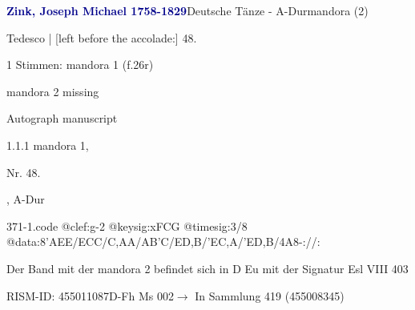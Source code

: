 \documentclass[twocolumn]{book}
\begin{document}
\par \vspace{7pt} \textcolor{darkblue}{\textbf{Zink, Joseph Michael  1758-1829}}\hfillplus{\textbf{[371]}}\newline Deutsche Tänze - A-Dur\newline mandora (2)
\par \begin{itshape}[f.26r, at left:] Tedesco | [left before the accolade:] 48.\end{itshape} 
\par \textcolor{darkblue}{}  1 Stimmen: mandora 1  (f.26r)\newline \begin{small} mandora 2 missing\end{small} \newline Autograph manuscript
\par 1.1.1  mandora 1, \begin{itshape}Nr. 48.\end{itshape}, A-Dur  
\begin{filecontents*}{371-1.code}
@clef:g-2
@keysig:xFCG
@timesig:3/8
@data:{8'AEE}/{ECC}/{C,AA}/{AB'C}/{ED,B}/{'EC,A}/{'ED,B}/4A8-://:
\end{filecontents*}
\newline
%
\par Der Band mit der mandora 2 befindet sich in D Eu mit der Signatur Esl VIII 403
\par RISM-ID: 455011087\newline D-Fh  Ms 002\newline $\rightarrow$ In Sammlung 419 (455008345)
      
\end{document}
